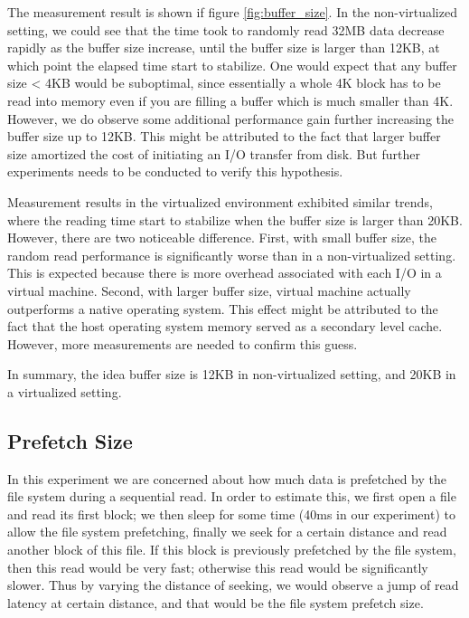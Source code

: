 The measurement result is shown if figure \ref{fig:buffer_size}. In the non-virtualized setting, we could see that the time took to randomly read 32MB data decrease rapidly as the buffer size increase, until the buffer size is larger than 12KB, at which point the elapsed time start to stabilize. One would expect that any buffer size < 4KB would be suboptimal, since essentially a whole 4K block has to be read into memory even if you are filling a buffer which is much smaller than 4K. However, we do observe some additional performance gain further increasing the buffer size up to 12KB. This might be attributed to the fact that larger buffer size amortized the cost of initiating an I/O transfer from disk. But further experiments needs to be conducted to verify this hypothesis. 

Measurement results in the virtualized environment exhibited similar trends, where the reading time start to stabilize when the buffer size is larger than 20KB. However, there are two noticeable difference. First, with small buffer size, the random read performance is significantly worse than in a non-virtualized setting. This is expected because there is more overhead associated with each I/O in a virtual machine. Second, with larger buffer size, virtual machine actually outperforms a native operating system. This effect might be attributed to the fact that the host operating system memory served as a secondary level cache. However, more measurements are needed to confirm this guess. 

In summary, the idea buffer size is 12KB in non-virtualized setting, and 20KB in a virtualized setting.

\subsection{Prefetch Size}
In this experiment we are concerned about how much data is prefetched by the file system during a sequential read. In order to estimate this, we first open a file and read its first block; we then sleep for some time (40ms in our experiment) to allow the file system prefetching, finally we seek for a certain distance and read another block of this file. If this block is previously prefetched by the file system, then this read would be very fast; otherwise this read would be significantly slower. Thus by varying the distance of seeking, we would observe a jump of read latency at certain distance, and that would be the file system prefetch size. 

